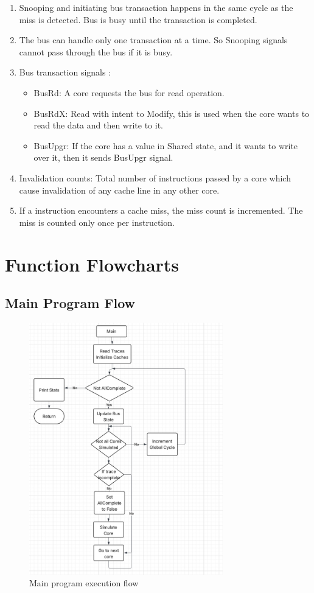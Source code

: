\documentclass[10pt]{article}
\begin{document}
\begin{enumerate}[label=\textbf{\arabic*.}]
    \item Snooping and initiating bus transaction happens in the same cycle as the miss is detected. Bus is busy until the transaction is completed.
    \item The bus can handle only one transaction at a time. So Snooping signals cannot pass through the bus if it is busy.
    \item Bus transaction signals :
    \begin{itemize}
        \item BusRd: A core requests the bus for read operation.
        \item BusRdX: Read with intent to Modify, this is used when the core wants to read the data and then write to it.
        \item BusUpgr: If the core has a value in Shared state, and it wants to write over it, then it sends BusUpgr signal.
    \end{itemize}
    \item Invalidation counts: Total number of instructions passed by a core which cause invalidation of any cache line in any other core.
    \item If a instruction encounters a cache miss, the miss count is incremented. The miss is counted only once per instruction.
    
    
\end{enumerate}

\section{Function Flowcharts}
\subsection{Main Program Flow}
\begin{figure}[H]
    \centering
    \includegraphics[width=0.75\textwidth]{./images/mainflow.jpg}
    \caption{Main program execution flow}
\end{figure}
\end{document}
